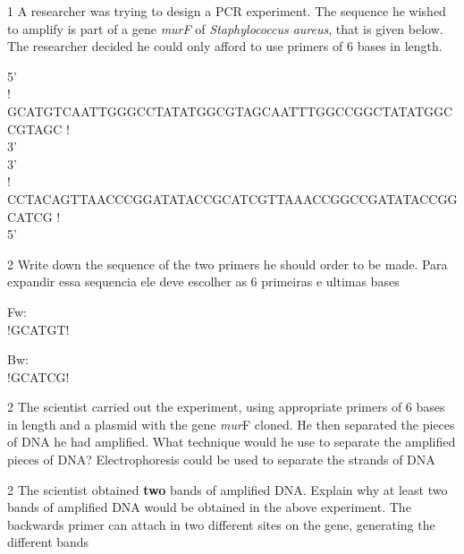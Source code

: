 \documentclass[\mainfilename]{subfiles}
\begin{document}
\begin{questionBox}1{ %
    A researcher was trying to design a PCR experiment. The sequence he wished to amplify is part of a gene \textit{murF} of \textit{Staphylococcus aureus}, that is given below.\\The researcher decided he could only afford to use primers of 6 bases in length.
} %

        \renewcommand\DNAblock{6}
        
        5'\\
        \DNA! GCATGTCAATTGGGCCTATATGGCGTAGCAATTTGGCCGGCTATATGGCCGTAGC !
        \\3'
        \\
        3'\\
        \DNA! CCTACAGTTAACCCGGATATACCGCATCGTTAAACCGGCCGATATACCGGCATCG !
        \\5'
\end{questionBox}

\begin{questionBox}2{ %
    Write down the sequence of the two primers he should order to be made.
} %
    Para expandir essa sequencia ele deve escolher as 6 primeiras e ultimas bases
    \begin{multicols}{2}
        Fw:\\\DNA!GCATGT!

        Bw:\\\DNA!GCATCG!
    \end{multicols}
\end{questionBox}

\begin{questionBox}2{ %
    The scientist carried out the experiment, using appropriate primers of 6 bases in length and a plasmid with the gene \textit{mur}F cloned. He then separated the pieces of DNA he had amplified. What technique would he use to separate the amplified pieces of DNA?
} %
    Electrophoresis could be used to separate the strands of DNA
\end{questionBox}

\begin{questionBox}2{ %
    The scientist obtained \textbf{two} bands of amplified DNA. Explain why at least two bands of amplified DNA would be obtained in the above experiment.
} %
    The backwards primer can attach in two different sites on the gene, generating the different bands
\end{questionBox}
\end{document}
